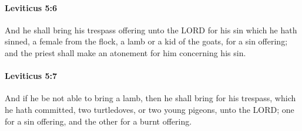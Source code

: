		\paragraph{Leviticus 5:6} %
			\label{LEVITICUS-5-6}

			And he shall bring his trespass offering unto the LORD for his sin which he hath sinned, a female from the flock, a lamb or a kid of the goats, for a sin offering; and the priest shall make an atonement for him concerning his sin.


		\paragraph{Leviticus 5:7} %
			\label{LEVITICUS-5-7}

			And if he be not able to bring a lamb, then he shall bring for his trespass, which he hath committed, two turtledoves, or two young pigeons, unto the LORD; one for a sin offering, and the other for a burnt offering.

